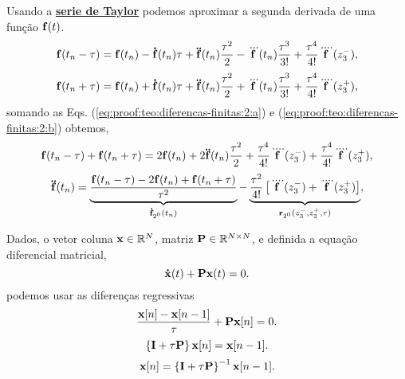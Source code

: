 \begin{myproofT}\label{proof:teo:diferenças-finitas:2}
Usando a \hyperref[def:taylor]{\textbf{serie de Taylor}} podemos aproximar 
a segunda derivada de uma função $\VECTOR{f}(t)$.
\begin{equation}\label{eq:proof:teo:diferencas-finitas:2:a}
\VECTOR{f}(t_n-\ToS) = 
\VECTOR{f}(t_n)-\DTVECTOR{f}(t_n)\ToS +\DDTVECTOR{f}(t_n) \frac{\ToS^2}{2}-\DDDTVECTOR{f}(t_n) \frac{\ToS^3}{3!} +\frac{\ToS^4}{4!}\DDDDTVECTOR{f}(z_{3}^{-}),
\end{equation}
\begin{equation}\label{eq:proof:teo:diferencas-finitas:2:b}
\VECTOR{f}(t_n+\ToS) = 
\VECTOR{f}(t_n)+\DTVECTOR{f}(t_n)\ToS +\DDTVECTOR{f}(t_n) \frac{\ToS^2}{2}+\DDDTVECTOR{f}(t_n) \frac{\ToS^3}{3!} +\frac{\ToS^4}{4!}\DDDDTVECTOR{f}(z_{3}^{+}),
\end{equation}
somando as Eqs. (\ref{eq:proof:teo:diferencas-finitas:2:a}) e (\ref{eq:proof:teo:diferencas-finitas:2:b}) obtemos,
\begin{equation}
\VECTOR{f}(t_n-\ToS) + \VECTOR{f}(t_n+\ToS) = 2 \VECTOR{f}(t_n)+2\DDTVECTOR{f}(t_n) \frac{\ToS^2}{2}+\frac{\ToS^4}{4!}\DDDDTVECTOR{f}(z_{3}^{-}) +\frac{\ToS^4}{4!}\DDDDTVECTOR{f}(z_{3}^{+}),
\end{equation}
\begin{equation}
 \DDTVECTOR{f}(t_n) =
\underbrace{\frac{\VECTOR{f}(t_n-\ToS) -2 \VECTOR{f}(t_n) + \VECTOR{f}(t_n+\ToS)}{\ToS^2}}_{\DTVECTOR{f}_{2^{0}}(t_n)}
-\underbrace{\frac{\ToS^2}{4!}\left[\DDDDTVECTOR{f}(z_{3}^{-}) +\DDDDTVECTOR{f}(z_{3}^{+})\right]}_{\VECTOR{R}_{2^{0}}(z_{3}^{-},z_{3}^{+},\ToS)} ,
\end{equation}
\end{myproofT}



\begin{myproofT}\label{proof:theo:differential-eq-discreto:order1:0}
Dados, o vetor coluna $\VECTOR{x} \in \mathbb{R}^N$, matriz $\MATRIX{P} \in \mathbb{R}^{N\times N}$, 
e definida a equação diferencial matricial,
\begin{equation}
\DTVECTOR{x}(t) + \MATRIX{P} \VECTOR{x}(t)=0.
\end{equation}
podemos usar as diferenças regressivas
\begin{equation}
\frac{\VECTOR{x}[n]-\VECTOR{x}[n-1]}{\ToS} + \MATRIX{P} \VECTOR{x}[n]=0.
\end{equation}
\begin{equation}
\left\{\MATRIX{I}  + \ToS \MATRIX{P}\right\} \VECTOR{x}[n]=\VECTOR{x}[n-1].
\end{equation}
\begin{equation}
\VECTOR{x}[n]=\left\{\MATRIX{I}  + \ToS \MATRIX{P}\right\}^{-1}\VECTOR{x}[n-1].
\end{equation}
\end{myproofT}

